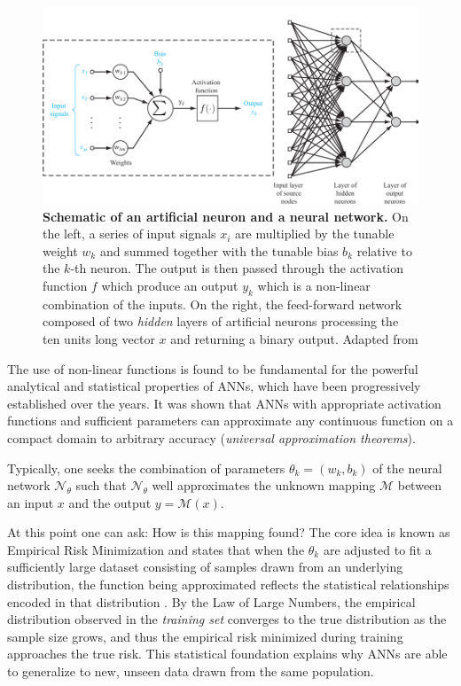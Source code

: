 \begin{figure}[H]
    \centering
    \includegraphics[width=\textwidth]{figures/Intro/neuron2.pdf}
    \caption{\textbf{Schematic of an artificial neuron and a neural network.} On the left, a series of input signals 
    $x_i$ are multiplied by the tunable weight $w_{k}$ and summed together with the tunable bias $b_k$ relative to 
    the $k$-th neuron. The output is then passed through the activation function $f$ which produce an output $y_k$ 
    which is a non-linear combination of the inputs. On the right, the feed-forward network composed of two \textit{hidden}
    layers of artificial neurons processing the ten units long vector $x$ and returning a binary output.
    Adapted from \cite{haykin2009neural}}
    \label{fig:neuron}
\end{figure}

The use of non-linear functions is found to be fundamental for the powerful analytical and statistical properties of ANNs, 
which have been progressively 
established over the years. It was shown \cite{Cybenko1989, Hornik_1989, Leshno_1993} that ANNs with appropriate 
activation functions and sufficient parameters can approximate any continuous function on a compact domain to arbitrary 
accuracy (\textit{universal approximation theorems}). 

Typically, one seeks the combination of parameters $\theta_k = (w_k, b_k)$ of the neural network $\mathcal{N}_{\theta}$ 
such that $\mathcal{N}_{\theta}$ well approximates the unknown mapping $\mathcal{M}$ between an input $x$ and the output 
$y = \mathcal{M}(x)$.  

At this point one can ask: How is this mapping found? The core idea is known as Empirical Risk Minimization and states that 
when the $\theta_k$ are adjusted to fit a sufficiently large dataset consisting of samples drawn from an underlying distribution, 
the function being approximated reflects the statistical relationships encoded in that distribution \cite{Hornik_1990}.
By the Law of Large Numbers, the empirical distribution observed in the \textit{training set} converges to the true 
distribution as the sample size grows, and thus the empirical risk minimized during training approaches the true 
risk. This statistical foundation explains why ANNs are able to generalize to new, unseen data drawn from the 
same population. 

